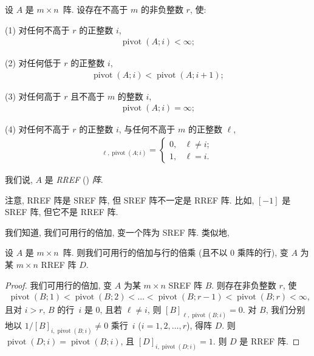 \documentclass[../libro.tex]{subfiles}
\begin{document}
\begin{definition}
    设 \(A\) 是 \(m \times n\)~阵.
    设存在不高于 \(m\) 的非负整数 \(r\), 使:

    (1)
    对任何不高于 \(r\) 的正整数 \(i\),
    \begin{align*}
        \operatorname{pivot} {(A; i)} < \infty;
    \end{align*}

    (2)
    对任何低于 \(r\) 的正整数 \(i\),
    \begin{align*}
        \operatorname{pivot} {(A; i)}
        < \operatorname{pivot} {(A; i + 1)};
    \end{align*}

    (3)
    对任何高于 \(r\) 且不高于 \(m\) 的整数 \(i\),
    \begin{align*}
        \operatorname{pivot} {(A; i)} = \infty;
    \end{align*}

    (4)
    对任何不高于 \(r\) 的正整数 \(i\),
    与任何不高于 \(m\) 的正整数 \(\ell\),
    \begin{align*}
        [A]_{\ell,\operatorname{pivot} {(A; i)}} =
        \begin{cases}
            0, & \ell \neq i; \\
            1, & \ell = i.
        \end{cases}
    \end{align*}

    我们说, \(A\) 是 \emph{RREF}
    () \emph{阵}.
\end{definition}

注意, RREF 阵是 SREF 阵,
但 SREF 阵不一定是 RREF 阵.
比如, \([-1]\) 是 SREF 阵, 但它不是 RREF 阵.

我们知道, 我们可用行的倍加,
变一个阵为 SREF 阵.
类似地,

\begin{theorem}
    设 \(A\) 是 \(m \times n\)~阵.
    则我们可用行的倍加与行的倍乘
    (且不以 \(0\) 乘阵的行),
    变 \(A\) 为某 \(m \times n\) RREF 阵 \(D\).
\end{theorem}

\begin{proof}
    我们可用行的倍加,
    变 \(A\) 为某 \(m \times n\) SREF 阵 \(B\).
    则存在非负整数 \(r\), 使
    \begin{align*}
        \operatorname{pivot} {(B; 1)}
        < \operatorname{pivot} {(B; 2)}
        < \dots
        < \operatorname{pivot} {(B; r-1)}
        < \operatorname{pivot} {(B; r)}
        < \infty,
    \end{align*}
    且对 \(i > r\),
    \(B\) 的行~\(i\) 是 \(0\),
    且若 \(\ell \neq i\),
    则 \([B]_{\ell,\operatorname{pivot} {(B; i)}} = 0\).
    对 \(B\),
    我们分别地以
    \(1/[B]_{i,\operatorname{pivot} {(B; i)}} \neq 0\)
    乘行~\(i\)
    (\(i = 1, 2, \dots, r\)),
    得阵 \(D\).
    则 \(\operatorname{pivot} {(D; i)}
    = \operatorname{pivot} {(B; i)}\),
    且 \([D]_{i,\operatorname{pivot} {(D; i)}} = 1\).
    则 \(D\) 是 RREF 阵.
\end{proof}
\end{document}
